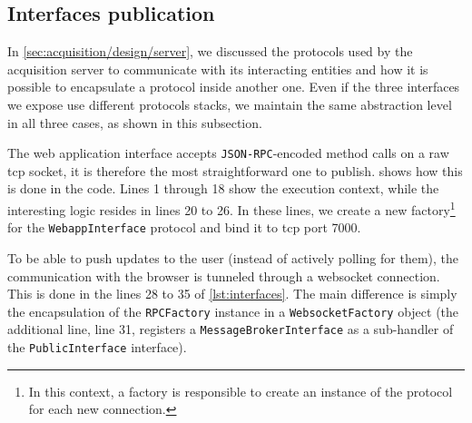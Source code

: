 \subsection{Interfaces publication}

In \vref{sec:acquisition/design/server}, we discussed the protocols used by the acquisition server to communicate with its interacting entities and how it is possible to encapsulate a protocol inside another one. Even if the three interfaces we expose use different protocols stacks, we maintain the same abstraction level in all three cases, as shown in this subsection.

The web application interface accepts \texttt{JSON-RPC}-encoded method calls on a raw \gls{tcp} socket, it is therefore the most straightforward one to publish.  shows how this is done in the code. Lines 1 through 18 show the execution context, while the interesting logic resides in lines 20 to 26. In these lines, we create a new factory\footnote{In this context, a factory is responsible to create an instance of the protocol for each new connection.} for the \texttt{WebappInterface} protocol and bind it to \gls{tcp} port 7000.

To be able to push updates to the user (instead of actively polling for them), the communication with the browser is tunneled through a websocket connection. This is done in the lines 28 to 35 of \vref{lst:interfaces}. The main difference is simply the encapsulation of the \texttt{RPCFactory} instance in a \texttt{WebsocketFactory} object (the additional line, line 31, registers a \texttt{MessageBrokerInterface} as a sub-handler of the \texttt{PublicInterface} interface).

